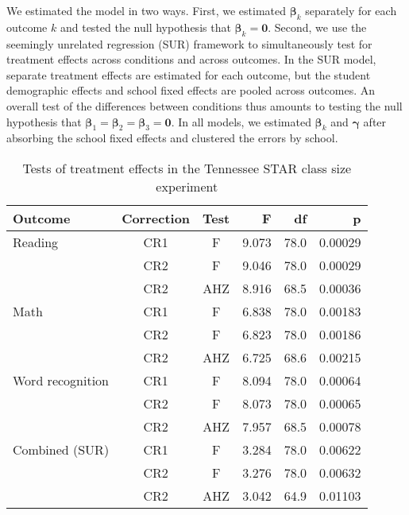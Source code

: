 \documentclass[12pt]{article}\usepackage[]{graphicx}\usepackage[]{color}
\newcommand{\bm}{\mathbf}
\newcommand{\bs}{\boldsymbol}
\begin{document}
We estimated the model in two ways. First, we estimated $\bs\beta_k$ separately for each outcome $k$ and tested the null hypothesis that $\bs\beta_k = \bm{0}$. Second, we use the seemingly unrelated regression (SUR) framework to simultaneously test for treatment effects across conditions and across outcomes. In the SUR model, separate treatment effects are estimated for each outcome, but the student demographic effects and school fixed effects are pooled across outcomes. An overall test of the differences between conditions thus amounts to testing the null hypothesis that $\bs\beta_1 = \bs\beta_2 = \bs\beta_3 = \bm{0}$. In all models, we estimated $\bs\beta_k$ and $\bs\gamma$ after absorbing the school fixed effects and clustered the errors by school.

\begin{table}[tbh]
\centering
\begin{tabular}{lccrrr}
  \toprule
Outcome & Correction & Test & F & df & p \\ 
  \midrule
Reading & CR1 & F & 9.073 & 78.0 & 0.00029 \\ 
   & CR2 & F & 9.046 & 78.0 & 0.00029 \\ 
   & CR2 & AHZ & 8.916 & 68.5 & 0.00036 \\ 
   \midrule
Math & CR1 & F & 6.838 & 78.0 & 0.00183 \\ 
   & CR2 & F & 6.823 & 78.0 & 0.00186 \\ 
   & CR2 & AHZ & 6.725 & 68.6 & 0.00215 \\ 
   \midrule
Word recognition & CR1 & F & 8.094 & 78.0 & 0.00064 \\ 
   & CR2 & F & 8.073 & 78.0 & 0.00065 \\ 
   & CR2 & AHZ & 7.957 & 68.5 & 0.00078 \\ 
   \midrule
Combined (SUR) & CR1 & F & 3.284 & 78.0 & 0.00622 \\ 
   & CR2 & F & 3.276 & 78.0 & 0.00632 \\ 
   & CR2 & AHZ & 3.042 & 64.9 & 0.01103 \\ 
   \bottomrule
\end{tabular}
\caption{Tests of treatment effects in the Tennessee STAR class size experiment} 
\label{tab:STAR}
\end{table}
\end{document}
